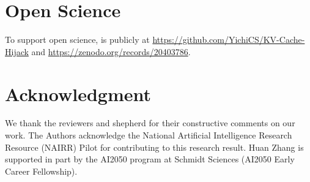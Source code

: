 \section*{Open Science}
To support open science, \sys is publicly at \url{https://github.com/YichiCS/KV-Cache-Hijack} and \url{https://zenodo.org/records/20403786}. 

\section*{Acknowledgment} 
We thank the reviewers and shepherd for their constructive comments on our work. 
% 
The Authors acknowledge the National Artificial Intelligence Research Resource (NAIRR) Pilot for contributing to this research result.
% 
Huan Zhang is supported in part by the AI2050 program at Schmidt Sciences (AI2050 Early Career Fellowship).


